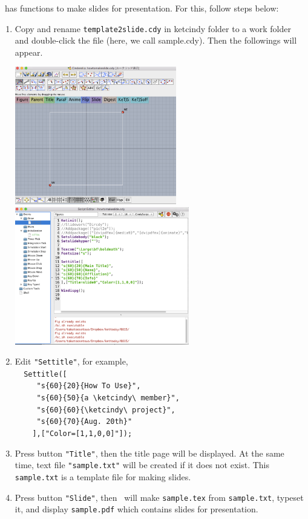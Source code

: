 \documentclass[papersize,a4paper,12pt]{article}
\begin{document}
\ketcindy\ has functions to make slides for presentation. 
For this, follow steps below:
\begin{enumerate}[1)]
\item Copy and rename \verb|template2slide.cdy| in ketcindy folder to a work folder and double-click the file (here, we call sample.cdy). Then the followings will appear.
\begin{center}
\includegraphics[bb=0.00 0.00 743.00 632.00,height=60mm]{fig/slidescreen.pdf}\hspace{5mm}
\includegraphics[bb=0.00 0.00 802.00 633.00,height=60mm]{fig/slidescript.pdf}
\end{center}
\item Edit \verb|"Settitle"|, for example,\\
\verb|  Settitle([|\\
\verb|     "s{60}{20}{How To Use}",|\\
\verb|     "s{60}{50}{a \ketcindy\ member}",|\\
\verb|     "s{60}{60}{\ketcindy\ project}",|\\
\verb|     "s{60}{70}{Aug. 20th}"|\\
\verb|    ],["Color=[1,1,0,0]"]);|
\item Press button \verb|"Title"|, then the title page will be displayed. At the same time,  text file \verb|"sample.txt"| will be created if it does not exist. This \verb|sample.txt| is a template file for making slides.
\item Press button \verb|"Slide"|, then \ketcindy\ will make \verb|sample.tex| from \verb|sample.txt|, 
typeset it, and display \verb|sample.pdf| which contains slides for presentation.
\end{enumerate}
 
\end{document}
